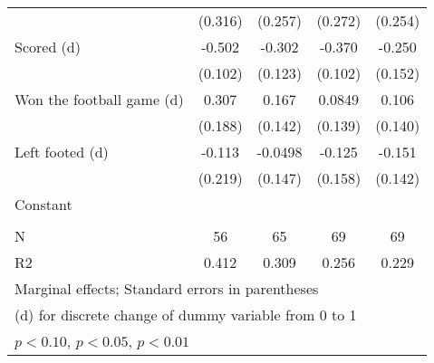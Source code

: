 {\begin{tabular}{l*{4}{c}}
                    &     (0.316)         &     (0.257)         &     (0.272)         &     (0.254)         \\
[1em]
Scored (d)          &      -0.502\sym{***}&      -0.302\sym{**} &      -0.370\sym{***}&      -0.250         \\
                    &     (0.102)         &     (0.123)         &     (0.102)         &     (0.152)         \\
[1em]
Won the football game (d)&       0.307         &       0.167         &      0.0849         &       0.106         \\
                    &     (0.188)         &     (0.142)         &     (0.139)         &     (0.140)         \\
[1em]
Left footed (d)     &      -0.113         &     -0.0498         &      -0.125         &      -0.151         \\
                    &     (0.219)         &     (0.147)         &     (0.158)         &     (0.142)         \\
[1em]
Constant            &                     &                     &                     &                     \\
                    &                     &                     &                     &                     \\
\hline
N                   &          56         &          65         &          69         &          69         \\
R2                  &       0.412         &       0.309         &       0.256         &       0.229         \\
\hline\hline
\multicolumn{5}{l}{\footnotesize Marginal effects; Standard errors in parentheses}\\
\multicolumn{5}{l}{\footnotesize  (d) for discrete change of dummy variable from 0 to 1}\\
\multicolumn{5}{l}{\footnotesize \sym{*} \(p<0.10\), \sym{**} \(p<0.05\), \sym{***} \(p<0.01\)}\\
\end{tabular}
}

